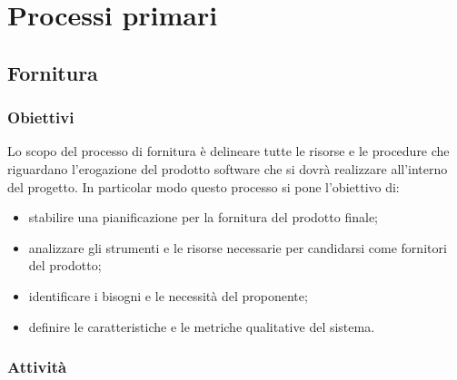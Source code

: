 \section{Processi primari}
\subsection{Fornitura}
\subsubsection{Obiettivi}
Lo scopo del processo di fornitura è delineare tutte le risorse e le procedure che riguardano l'erogazione del prodotto software che si dovrà realizzare all'interno del progetto. In particolar modo questo processo si pone l'obiettivo di:
\begin{itemize}
	\item stabilire una pianificazione per la fornitura del prodotto finale;
	\item analizzare gli strumenti e le risorse necessarie per candidarsi come fornitori del prodotto;
	\item identificare i bisogni e le necessità del proponente;
	\item definire le caratteristiche e le metriche qualitative del sistema.
\end{itemize}

\subsubsection{Attività}
